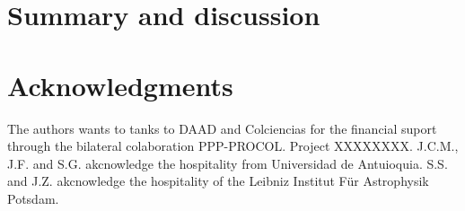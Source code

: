 \documentclass[useAMS,usenatbib]{mn2e}
\begin{document}


\section{Summary and discussion}

 
\section*{Acknowledgments}

The authors wants to tanks to DAAD and Colciencias for the financial
suport through the bilateral colaboration PPP-PROCOL. Project
XXXXXXXX. J.C.M., J.F. and S.G. akcnowledge the hospitality from
Universidad de Antuioquia. S.S. and J.Z. akcnowledge the hospitality
of the Leibniz Institut F\"{u}r Astrophysik Potsdam.

\end{document}
